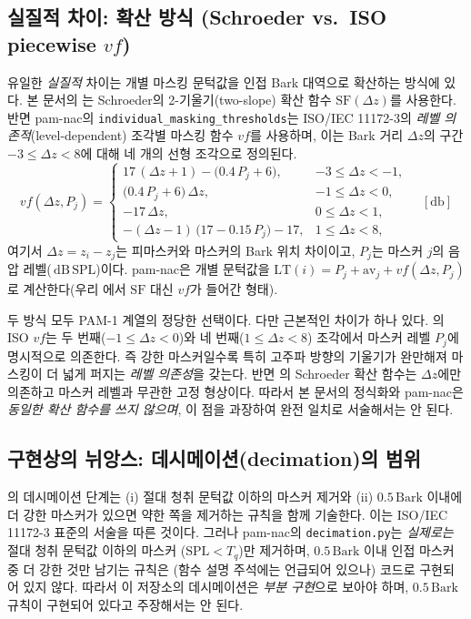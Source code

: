 \documentclass[11pt,a4paper]{article}
\newcommand{\dBSPL}{\ensuremath{\,\mathrm{dB\,SPL}}}  %
\newcommand{\Bark}{\ensuremath{\,\mathrm{Bark}}}      %
\newcommand{\ATH}{T_{q}}                               %
\newcommand{\dz}{\Delta z}                             %
\begin{document}
\subsection{실질적 차이: 확산 방식 (Schroeder vs.\ ISO piecewise \texorpdfstring{$vf$}{vf})}
유일한 \emph{실질적} 차이는 개별 마스킹 문턱값을 인접 Bark 대역으로 확산하는 방식에
있다. 본 문서의 는 Schroeder의 2-기울기(two-slope) 확산 함수
$\mathrm{SF}(\dz)$를 사용한다. 반면 pam-nac의
\texttt{individual\_masking\_thresholds}는 ISO/IEC 11172-3\cite{iso11172}의
\emph{레벨 의존적}(level-dependent) 조각별 마스킹 함수 $vf$를 사용하며, 이는
Bark 거리 $\dz$의 구간 $-3 \le \dz < 8$에 대해 네 개의 선형 조각으로 정의된다.
\begin{equation}\label{eq:vf}
  vf(\dz, P_j) =
  \begin{cases}
    17\,(\dz + 1) - \bigl(0.4\,P_j + 6\bigr),
      & -3 \le \dz < -1, \\[3pt]
    \bigl(0.4\,P_j + 6\bigr)\,\dz,
      & -1 \le \dz < 0, \\[3pt]
    -17\,\dz,
      & 0 \le \dz < 1, \\[3pt]
    -(\dz - 1)\,\bigl(17 - 0.15\,P_j\bigr) - 17,
      & 1 \le \dz < 8,
  \end{cases}
  \quad [\si{\decibel}]
\end{equation}
여기서 $\dz = z_i - z_j$는 피마스커와 마스커의 Bark 위치 차이이고, $P_j$는 마스커
$j$의 음압 레벨(\dBSPL)이다. pam-nac은 개별 문턱값을
$\mathrm{LT}(i) = P_j + \mathrm{av}_j + vf(\dz, P_j)$로 계산한다(우리
에서 $\mathrm{SF}$ 대신 $vf$가 들어간 형태).

두 방식 모두 PAM-1 계열의 정당한 선택이다. 다만 근본적인 차이가 하나 있다.
의 ISO $vf$는 두 번째($-1 \le \dz < 0$)와 네 번째($1 \le \dz < 8$)
조각에서 마스커 레벨 $P_j$에 명시적으로 의존한다. 즉 강한 마스커일수록 특히
고주파 방향의 기울기가 완만해져 마스킹이 더 넓게 퍼지는 \emph{레벨 의존성}을
갖는다. 반면 의 Schroeder 확산 함수는 $\dz$에만 의존하고 마스커
레벨과 무관한 고정 형상이다. 따라서 본 문서의 정식화와 pam-nac은 \emph{동일한
확산 함수를 쓰지 않으며}, 이 점을 과장하여 완전 일치로 서술해서는 안 된다.

\subsection{구현상의 뉘앙스: 데시메이션(decimation)의 범위}
의 데시메이션 단계는 (i) 절대 청취 문턱값 이하의 마스커 제거와
(ii) $0.5\Bark$ 이내에 더 강한 마스커가 있으면 약한 쪽을 제거하는 규칙을 함께
기술한다. 이는 ISO/IEC 11172-3 표준의 서술을 따른 것이다. 그러나 pam-nac의
\texttt{decimation.py}는 \emph{실제로는} 절대 청취 문턱값 이하의 마스커
($\mathrm{SPL} < \ATH$)만 제거하며, $0.5\Bark$ 이내 인접 마스커 중 더 강한 것만
남기는 규칙은 (함수 설명 주석에는 언급되어 있으나) 코드로 구현되어 있지 않다.
따라서 이 저장소의 데시메이션은 \emph{부분 구현}으로 보아야 하며, $0.5\Bark$
규칙이 구현되어 있다고 주장해서는 안 된다.
\end{document}

